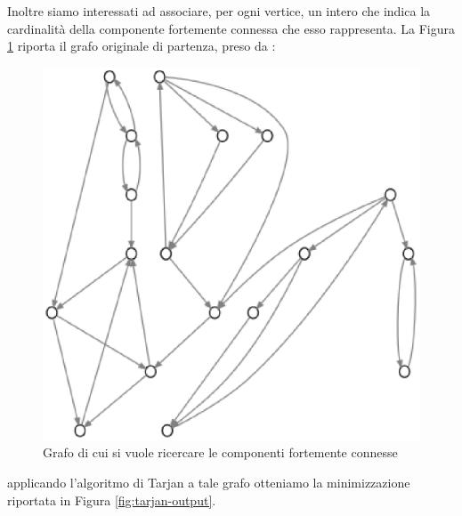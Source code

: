 Inoltre siamo interessati ad associare, per ogni vertice, un intero
che indica la cardinalit\`a della componente fortemente connessa che
esso rappresenta. La Figura \ref{fig:before-applying-tarjan} riporta
il grafo originale di partenza, preso da \cite{Algoritmica}:
\begin{figure}
  \centering
  \includegraphics{images/OnePipingLevelUnitTest_Printer_DFS_PrinterPipe_Crescenzi-phase-PrinterPipeFilter-level-0.eps}
  \caption{Grafo di cui si vuole ricercare le componenti fortemente
    connesse}
  \label{fig:before-applying-tarjan}
\end{figure}
applicando l'algoritmo di Tarjan a tale grafo otteniamo la
minimizzazione riportata in Figura \ref{fig:tarjan-output}.

